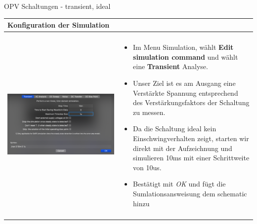      \begin{frame}[t]{OPV Schaltungen - transient, ideal}
    
      \begin{spacing}{0.9} \begin{tiny}
      \begin{table}[h!]
        \begin{tabular}{p{4cm} p{6cm}}
          \hline
          \textbf{Konfiguration der Simulation} & \\
          \hline \\
          \begin{minipage}{.3\textwidth}
           \includegraphics[width=\linewidth]{pictures/simulationcmd_5.png}
         \end{minipage} 
         & 
         \begin{minipage}{.7\textwidth}
         \begin{itemize}
           \item Im Menu Simulation, wählt \textbf{Edit simulation command} und wählt eine \textbf{Transient} Analyse. 
           \item Unser Ziel ist es am Ausgang eine Verstärkte Spannung entsprechend des Verstärkungsfaktors der Schaltung zu messen.
           \item Da die Schaltung ideal kein Einschwingverhalten zeigt, starten wir direkt mit der Aufzeichnung und simulieren 10ms mit einer Schrittweite von 10us.
           \item Bestätigt mit \textit{OK} und fügt die Sumlationsansweisung dem schematic hinzu
         \end{itemize}
         \end{minipage} 
         \\
          & \\
          \hline

\end{tabular}
\end{table}
\end{tiny}
\end{spacing}
\end{frame}
